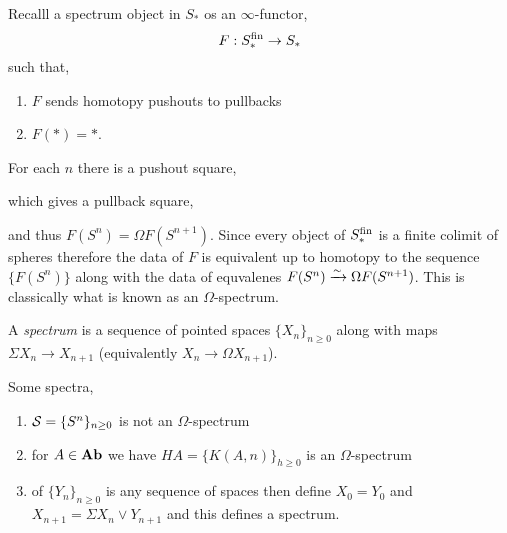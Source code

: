 \documentclass[12pt]{article}
\begin{document}
Recalll a spectrum object in $S_*$ os an $\infty$-functor,
\[ F : S_*^\fin \to S_* \]
such that,
\begin{enumerate}
\item $F$ sends homotopy pushouts to pullbacks
\item $F(*) = *$.
\end{enumerate}

\begin{rmk}
For each $n$ there is a pushout square,
\begin{center}
\end{center}
which gives a pullback square,
\begin{center}
\end{center}
and thus $F(S^n) = \Omega F(S^{n+1})$. Since every object of $S_*^{\fin}$ is a finite colimit of spheres therefore the data of $F$ is equivalent up to homotopy to the sequence $\{ F(S^n) \}$ along with the data of equvalenes $F(S^n) \iso \Omega F(S^{n+1})$. This is classically what is known as an $\Omega$-spectrum.
\end{rmk}

\begin{defn}
A \textit{spectrum} is a sequence of pointed spaces $\{ X _n \}_{n \ge 0}$ along with maps $\Sigma X_n \to X_{n+1}$ (equivalently $X_n \to \Omega X_{n+1}$).
\end{defn}

\begin{example}
Some spectra,
\begin{enumerate}
\item $\S = \{ S^n \}_{n \ge 0}$ is not an $\Omega$-spectrum
\item for $A \in \Ab$ we have $H A = \{ K(A, n) \}_{h \ge 0}$ is an $\Omega$-spectrum

\item of $\{ Y_n \}_{n \ge 0}$ is any sequence of spaces then define $X_0 = Y_0$ and $X_{n+1} = \Sigma X_n \vee Y_{n+1}$ and this defines a spectrum.
\end{enumerate}
\end{example}
\end{document}
